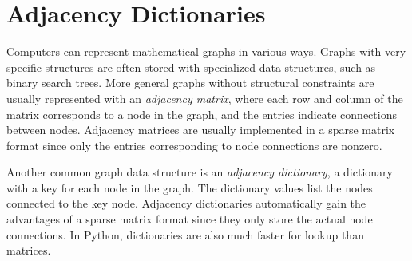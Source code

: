 
\section*{Adjacency Dictionaries} %

Computers can represent mathematical graphs in various ways.
Graphs with very specific structures are often stored with specialized data structures, such as binary search trees.
More general graphs without structural constraints are usually represented with an \emph{adjacency matrix}, where each row and column of the matrix corresponds to a node in the graph, and the entries indicate connections between nodes.
Adjacency matrices are usually implemented in a sparse matrix format since only the entries corresponding to node connections are nonzero.

Another common graph data structure is an \emph{adjacency dictionary}, a dictionary with a key for each node in the graph.
The dictionary values list the nodes connected to the key node.
Adjacency dictionaries automatically gain the advantages of a sparse matrix format since they only store the actual node connections.
In Python, dictionaries are also much faster for lookup than matrices.

